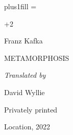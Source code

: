 
\footlinefalse
\bgroup
\parindent=0pt
\parskip=0pt
\leftskip=0pt plus1fill \rightskip=\leftskip %

\vglue\dimexpr\topskip+2\baselineskip

{\scalemain\typoscale[1440/1440]
    Franz Kafka
}

\baselineskip

{\scalemain\typoscale[1440/1440]
    \currvar
    \uppercase{Metamorphosis}
}

\baselineskip

{\it 
    Translated by

    \baselineskip

    David Wyllie
}

\vfill

{\scalemain\typoscale[800/800]
    Privately printed

    Location, 2022
}

\egroup

